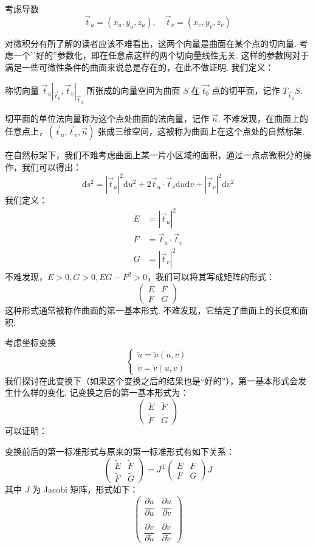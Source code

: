 考虑导数
\[
\vec{t}_u = (x_{u}, y_{u}, z_{u}), \quad \vec{t}_v = (x_{v}, y_{v}, z_{v})
\]

对微积分有所了解的读者应该不难看出，这两个向量是曲面在某个点的切向量. 考虑一个ˋˋ好的''参数化，即在任意点这样的两个切向量线性无关. 这样的参数网对于满足一些可微性条件的曲面来说总是存在的，在此不做证明. 我们定义：
\begin{definition}
    称切向量 $\vec{t}_u |_{\vec{t}_0}, \vec{t}_v |_{\vec{t}_0}$ 所张成的向量空间为曲面 $S$ 在 $\vec{t_0}$ 点的切平面，记作 $T_{\vec{t}_0} S$.
\end{definition}
切平面的单位法向量称为这个点处曲面的法向量，记作 $\vec{n}$. 不难发现，在曲面上的任意点上，$(\vec{t}_u, \vec{t}_v, \vec{n})$ 张成三维空间，这被称为曲面上在这个点处的自然标架.

在自然标架下，我们不难考虑曲面上某一片小区域的面积，通过一点点微积分的操作，我们可以得出：
\[
\mathrm{d} s^2 = |\vec{t}_u|^2 \mathrm{d} u^2 + 2 \vec{t}_u \cdot \vec{t}_v \mathrm{d} u \mathrm{d} v + |\vec{t}_v|^2 \mathrm{d} v^2
\]
我们定义：
\begin{align*}
    E &= |\vec{t}_u|^2 \\
    F &= \vec{t}_u \cdot \vec{t}_v \\
    G &= |\vec{t}_v|^2
\end{align*}
不难发现，$E > 0, G > 0, E G - F^2 > 0$，我们可以将其写成矩阵的形式：
\[
\begin{pmatrix}
    E & F \\
    F & G
\end{pmatrix}
\]
这种形式通常被称作曲面的第一基本形式. 不难发现，它给定了曲面上的长度和面积.

考虑坐标变换
\[
\begin{cases}
    \tilde{u} = \tilde{u}(u, v) \\
    \tilde{v} = \tilde{v}(u, v)
\end{cases}
\]
我们探讨在此变换下（如果这个变换之后的结果也是``好的''），第一基本形式会发生什么样的变化. 记变换之后的第一基本形式为：
\[
\begin{pmatrix}
    \tilde{E} & \tilde{F} \\
    \tilde{F} & \tilde{G}
\end{pmatrix}
\]
可以证明：
\begin{theorem}{}{}
    变换前后的第一标准形式与原来的第一标准形式有如下关系：
    \[
    \begin{pmatrix}
        \tilde{E} & \tilde{F} \\
        \tilde{F} & \tilde{G}
    \end{pmatrix}
     =
    J^\mathrm{T} \begin{pmatrix}
        E & F \\
        F & G
    \end{pmatrix} J
    \]
    其中 $J$ 为 Jacobi 矩阵，形式如下：
    \[
    \begin{pmatrix}
        \dfrac{\partial u}{\partial \tilde{u}} & \dfrac{\partial u}{\partial \tilde{v}} \\ \\
        \dfrac{\partial v}{\partial \tilde{u}} &
        \dfrac{\partial v}{\partial \tilde{v}}
    \end{pmatrix}
    \]
\end{theorem}

